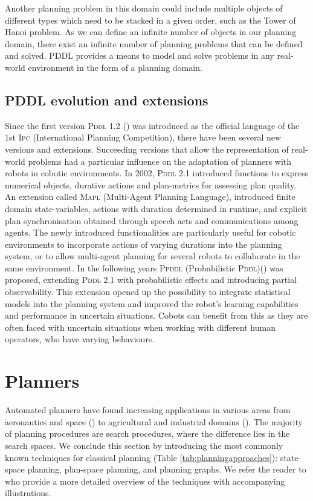 Another planning problem in this domain could include multiple objects of different types which need to be stacked in a given order, such as the Tower of Hanoi problem.
As we can define an infinite number of objects in our planning domain, there exist an infinite number of planning problems that can be defined and solved. 
PDDL provides a means to model and solve problems in any real-world environment in the form of a planning domain. 


\subsection{PDDL evolution and extensions}\label{subsec:PDDL evolution}

Since the first version \textsc{Pddl} 1.2 (\cite{mcdermott1998pddl}) was introduced as the official language of the 1st \textsc{Ipc} (International Planning Competition), there have been several new versions and extensions.
Succeeding versions that allow the representation of real-world problems had a particular influence on the adaptation of planners with robots in cobotic environments. 
In 2002, \textsc{Pddl} 2.1 introduced functions to express numerical objects, durative actions and plan-metrics for assessing plan quality.
An extension called \textsc{Mapl} (Multi-Agent Planning Language), introduced finite domain state-variables, actions with duration determined in runtime, and explicit plan synchronisation obtained through speech acts and communications among agents. 
The newly introduced functionalities are particularly useful for cobotic environments to incorporate actions of varying durations into the planning system, or to allow multi-agent planning for several robots to collaborate in the same environment.
In the following years \textsc{Ppddl} (Probabilistic \textsc{Pddl})(\cite{younes:04a}) was proposed, extending \textsc{Pddl} 2.1 with probabilistic effects and introducing partial observability. 
This extension opened up the possibility to integrate statistical models into the planning system and improved the robot's learning capabilities and performance in uncertain situations. 
Cobots can benefit from this as they are often faced with uncertain situations when working with different human operators, who have varying behaviours.

\section{Planners}\label{subsec:Planners}
Automated planners have found increasing applications in various areas from aeronautics and space (\cite{aarup1992optimum}) to agricultural and industrial domains (\cite{aggriculture}). 
The majority of planning procedures are search procedures, where the difference lies in the search spaces.
We conclude this section by introducing the most commonly known techniques for classical planning (Table \ref{tab:planningapproaches}):
state-space planning, plan-space planning, and planning graphs. 
We refer the reader to \cite{nau2007current} who provide a more detailed overview of the techniques with accompanying illustrations.

